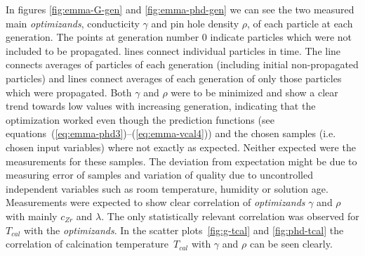 In figures \ref{fig:emma-G-gen} and \ref{fig:emma-phd-gen} we can see the two measured main \textit{optimizands}, 
conducticity $\gamma$ and pin hole density $\rho$, of each particle at each generation.
The  points at generation number 0 indicate particles which were not included to be propagated. 
 lines connect individual particles in time. 
The  line connects averages of particles of each generation (including initial non-propagated particles) and 
 lines connect averages of each generation of only those particles which were propagated. 
%
Both $\gamma$ and $\rho$ were to be minimized and show a clear trend towards low values with increasing generation, 
indicating that the optimization worked even though 
the prediction functions (see equations~(\ref{eq:emma-phd3})--(\ref{eq:emma-vcal4})) 
and the chosen samples (i.e. chosen input variables) where not exactly as expected. 
Neither expected were the measurements for these samples.
The deviation from expectation might be due to measuring error of samples and variation of quality due to uncontrolled independent variables such as room temperature, humidity or solution age. 
Measurements were expected to show clear correlation of \textit{optimizands} $\gamma$ and $\rho$ with mainly $c_{Zr}$ and $\lambda$.
The only statistically relevant correlation was observed for $T_{cal}$ with the \textit{optimizands}.
%
In the scatter plots~\ref{fig:g-tcal} and \ref{fig:phd-tcal} the correlation of calcination temperature~$T_{cal}$ with $\gamma$ and $\rho$ can be seen clearly. 


